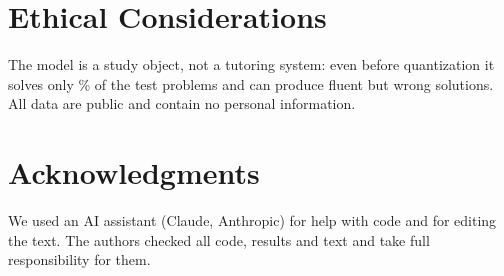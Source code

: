 \documentclass[11pt]{article}
\begin{document}
\section*{Ethical Considerations}

The model is a study object, not a tutoring system: even before quantization it solves only \RefAcc\% of the test problems and can produce fluent but wrong solutions. All data are public and contain no personal information.

\section*{Acknowledgments}

We used an AI assistant (Claude, Anthropic) for help with code and for editing the text. The authors checked all code, results and text and take full responsibility for them.


\end{document}

